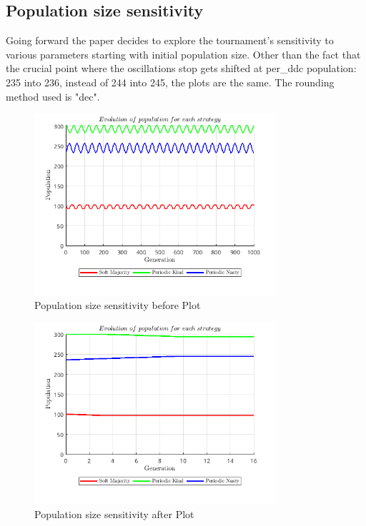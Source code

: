 \subsection{Population size sensitivity}
Going forward the paper decides to explore the tournament's sensitivity to various parameters starting with initial population size. Other than the fact that the crucial point where the oscillations stop gets shifted at per_ddc population: 235 into 236, instead of 244 into 245, the plots are the same. The rounding method used is "dec".
\begin{figure}[H]
    \centering
    \includegraphics[width=0.8\textwidth]{media/meetings/population_size_sensitivity_before_dec.png}
    \caption{Population size sensitivity before Plot}
\end{figure}
\begin{figure}[H]
    \centering
    \includegraphics[width=0.8\textwidth]{media/meetings/population_size_sensitivity_after_dec.png}
    \caption{Population size sensitivity after Plot}
\end{figure}

